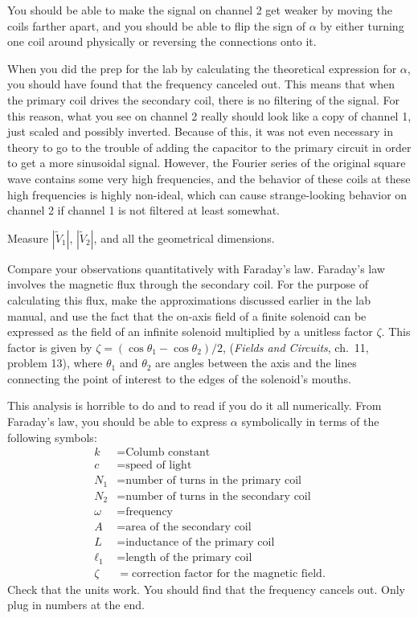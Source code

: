You should be able to make the signal on channel 2 get weaker by moving the
coils farther apart, and you should be able to flip the sign of $\alpha$
by either turning one coil around physically or reversing the connections
onto it.

When you did the prep for the lab by calculating the theoretical expression for
$\alpha$, you should have found that the frequency canceled out. This means
that when the primary coil drives the secondary coil, there is no filtering
of the signal. For this reason, what you see on channel 2 really should look
like a copy of channel 1, just scaled and possibly inverted. Because of this,
it was not even necessary in theory to go to the trouble of adding the capacitor
to the primary circuit in order to get a more sinusoidal signal. However, the
Fourier series of the original square wave contains some very high frequencies,
and the behavior of these coils at these high frequencies is highly non-ideal,
which can cause strange-looking behavior on channel 2 if channel 1 is not
filtered at least somewhat.

Measure $|\tilde{V}_1|$, $|\tilde{V}_2|$, and all the geometrical dimensions.

\analysis

Compare your observations quantitatively with Faraday's law.
Faraday's law involves the magnetic flux through the secondary coil.
For the purpose of calculating this flux,  make the approximations discussed earlier in the lab
manual, and use the fact that the on-axis field of a finite solenoid can be expressed as the
field of an infinite solenoid multiplied by a unitless factor $\zeta$.
This factor is given by
$\zeta = (\cos\theta_1-\cos\theta_2)/2$,
(\emph{Fields and Circuits}, ch.~11, problem 13), where
$\theta_1$ and $\theta_2$ are angles between the axis and the lines connecting
the point of interest to the edges of the solenoid's mouths.

This analysis is horrible to do and to read if you do it all numerically.
From Faraday's law, you should be able to
express $\alpha$ symbolically in terms of the following
symbols:
\begin{align*}
 k  &= \text{Columb constant} \\
 c  &= \text{speed of light} \\
 N_1  &= \text{number of turns in the primary coil} \\
 N_2  &= \text{number of turns in the secondary coil} \\
 \omega  &= \text{frequency} \\
 A  &= \text{area of the secondary coil} \\
 L  &= \text{inductance of the primary coil} \\
 \ell_1  &= \text{length of the primary coil} \\
 \zeta  &= \text{correction factor for the magnetic field}.
\end{align*}
Check that the units work. You should find that the frequency cancels out.
Only plug in numbers at the end.

